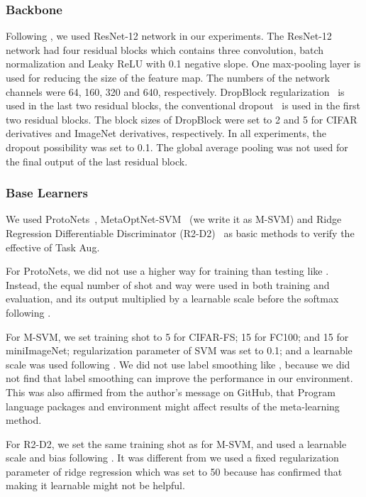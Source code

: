 \documentclass[10pt,twocolumn,letterpaper]{article}
\begin{document}
\subsubsection{Backbone}
Following \cite{lee2019meta,oreshkin2018tadam,mishra2017simple}, we used ResNet-12 network in our experiments. The ResNet-12 network had four residual blocks which contains three  convolution, batch normalization and Leaky ReLU with 0.1 negative slope. One  max-pooling layer is used for reducing the size of the feature map. The numbers of the network channels were 64, 160, 320 and 640, respectively. DropBlock regularization~\cite{ghiasi2018dropblock} is used in the last two residual blocks, the conventional dropout~\cite{hinton2012improving} is used in the first two residual blocks. The block sizes of DropBlock were set to 2 and 5 for CIFAR derivatives and ImageNet derivatives, respectively. In all experiments, the dropout possibility was set to 0.1. The global average pooling was not used for the final output of the last residual block.

\subsubsection{Base Learners}\label{Base_Learners}
We used ProtoNets~\cite{snell2017prototypical}, MetaOptNet-SVM~\cite{lee2019meta} (we write it as M-SVM) and Ridge Regression Differentiable Discriminator (R2-D2)~\cite{bertinetto2018meta} as basic methods to verify the effective of Task Aug.

For ProtoNets, we did not use a higher way for training than testing like \cite{snell2017prototypical}. Instead, the equal number of shot and way were used in both training and evaluation, and its output multiplied by a learnable scale before the softmax following \cite{oreshkin2018tadam,lee2019meta}.

For M-SVM, we set training shot to 5 for CIFAR-FS; 15 for FC100; and 15 for miniImageNet; regularization parameter of SVM was set to 0.1; and a learnable scale was used following \cite{lee2019meta}. We did not use label smoothing like \cite{lee2019meta}, because we did not find that label smoothing can improve the performance in our environment. This was also affirmed from the \cite{lee2019meta} author's message on GitHub, that Program language packages and environment might affect results of the meta-learning method.

For R2-D2, we set the same training shot as for M-SVM, and used a learnable scale and bias following \cite{bertinetto2018meta}. It was different from \cite{bertinetto2018meta} we used a fixed regularization parameter of ridge regression which was set to 50 because \cite{bertinetto2018meta} has confirmed that making it learnable might not be helpful.
\end{document}
